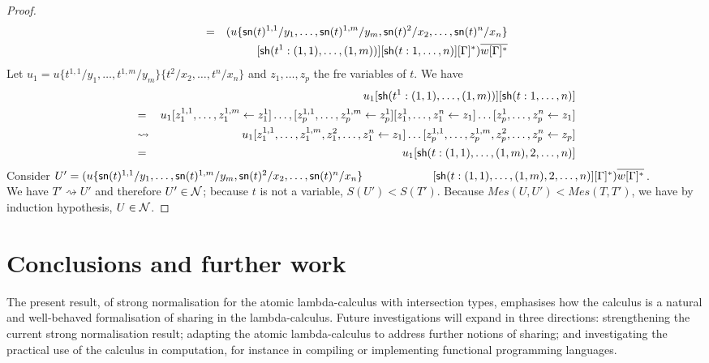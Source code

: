 \documentclass{llncs} %
\newif\ifnonotes\nonotesfalse
\newcommand{\TODO}[1]{\ifnonotes\else{\color{red}    \noindent{\bf TODO }#1}\fi}
\begin{document}
\begin{proof}
\begin{eqnarray*}
    & = & (u\{{\mathsf{sn}}(t)^{1,1}/y_1,\dots,{\mathsf{sn}}(t)^{1,m}/y_m, {\mathsf{sn}}(t)^2/x_2,\dots,{\mathsf{sn}}(t)^n/x_n\} \\
    &   & [{\mathsf{sh}} (t^1:(1,1),\dots,(1,m))][{\mathsf{sh}} (t:1,\dots,n)][\Gamma]^*)\overline{w[\Gamma]^*} 
\end{eqnarray*}
%
Let $u_1 = u\{t^{1,1}/y_1,\dots,t^{1,m}/y_m\}\{t^2/x_2,\dots,t^n/x_n\}$ and $z_1,\dots,z_p$ the fre variables of $t$. We have
%
\begin{eqnarray*}
  &                   & u_1[{\mathsf{sh}} (t^1:(1,1),\dots,(1,m))][{\mathsf{sh}} (t:1,\dots,n)] \\
  & =                 & u_1[z_1^{1,1}, \dots, z_1^{1,m} \leftarrow z_1^1]\dots, [z_p^{1,1}, \dots, z_p^{1,m} \leftarrow z_p^1][z_1^1,\dots,z_1^n\leftarrow z_1]\dots [z_p^1,\dots,z_p^n\leftarrow z_1] \\
  & \rightsquigarrow  & u_1[z_1^{1,1}, \dots, z_1^{1,m}, z_1^2,\dots,z_1^n\leftarrow z_1]\dots [z_p^{1,1}, \dots, z_p^{1,m}, z_p^2,\dots,z_p^n\leftarrow z_p] \\
  &  =                & u_1[{\mathsf{sh}} (t:(1,1),\dots,(1,m),2,\dots,n)]
\end{eqnarray*}
Consider $U' = (u\{{\mathsf{sn}}(t)^{1,1}/y_1,\dots,{\mathsf{sn}}(t)^{1,m}/y_m, {\mathsf{sn}}(t)^2/x_2,\dots,{\mathsf{sn}}(t)^n/x_n\} \\
\hspace*{62pt}[{\mathsf{sh}} (t:(1,1),\dots,(1,m),2,\dots,n)][\Gamma]^*)\overline{w[\Gamma]^*}$.
\\
We have $T'\rightsquigarrow U'$ and therefore $U'\in\mathcal{N}$; because $t$ is not a variable, $S(U')<S(T')$. 
Because $Mes(U,U') < Mes(T,T')$, we have by induction hypothesis, $U\in\mathcal{N}$.


\end{proof}



\section{Conclusions and further work}



The present result, of strong normalisation for the atomic lambda-calculus with intersection types, emphasises how the calculus is a natural and well-behaved formalisation of sharing in the lambda-calculus.
%
Future investigations will expand in three directions: strengthening the current strong normalisation result; adapting the atomic lambda-calculus to address further notions of sharing; and investigating the practical use of the calculus in computation, for instance in compiling or implementing functional programming languages.
\end{document}
